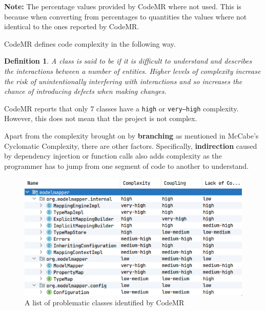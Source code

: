 \documentclass[12pt]{article}
\newcommand{\note}[1]{\textbf{Note:} #1}
\DeclareRobustCommand{\ul}[1]{%
	\uline{\phantom{#1}}%
	\llap{\contour{white}{#1}}%
}
\newtheorem*{definition}{Definition}
\begin{document}
\note{The percentage values provided by CodeMR where not used.
This is because when converting from percentages to quantities
the values where not identical to the ones reported by CodeMR.}

CodeMR defines code complexity in the following way.

\begin{definition}
    A class is said to be \ul{complex} if it is difficult to
    understand and describes the interactions between a number
    of entities. Higher levels of complexity increase the risk
    of unintentionally interfering with interactions and so
    increases the chance of introducing defects when making
    changes.
\end{definition}

CodeMR reports that only $7$ classes have a \texttt{high} or
\texttt{very--high} complexity. However, this does not mean that
the project is not complex.

Apart from the complexity brought on by \textbf{branching} as
mentioned in McCabe's Cyclomatic Complexity, there are other
factors. Specifically, \textbf{indirection} caused by dependency
injection or function calls also adds complexity as the
programmer has to jump from one segment of code to another to
understand.

\begin{figure}[H]
    \centering
    \includegraphics[width=14cm]{images/problematic-classes.png}
    \caption{A list of problematic classes identified by CodeMR}
    \label{problematic-classes}
\end{figure}
\end{document}
